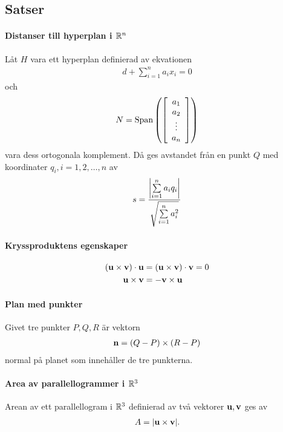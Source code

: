 \subsection{Satser}

\paragraph{Distanser till hyperplan i $\mathbb{R}^n$}
Låt $H$ vara ett hyperplan definierad av ekvationen
\begin{align*}
	d + \sum\limits_{i = 1}^{n} a_ix_i = 0
\end{align*}
och
\begin{align*}
	N = \text{Span}\left(
	\left[\begin{array}{c}
		a_1 \\
		a_2 \\
		\vdots \\
		a_n
	\end{array}\right]\right)
\end{align*}
vara dess ortogonala komplement. Då ges avstandet från en punkt $Q$ med koordinater $q_i, i = 1, 2, \dots, n$ av
\begin{align*}
	s = \frac{\abs{\sum\limits_{i = 1}^{n}a_iq_i}}{\sqrt{\sum\limits_{i = 1}^{n}a_i^2}}
\end{align*}

\proof

\paragraph{Kryssproduktens egenskaper}
\begin{align*}
	(\vect{u}\times\vect{v})\cdot\vect{u} &= (\vect{u}\times\vect{v})\cdot\vect{v} = 0 \\
	\vect{u}\times\vect{v}                &= -\vect{v}\times\vect{u}
\end{align*}

\proof

\paragraph{Plan med punkter}
Givet tre punkter $P, Q, R$ är vektorn
\begin{align*}
	\vect{n} = (Q - P)\times (R - P)
\end{align*}
normal på planet som innehåller de tre punkterna.

\proof

\paragraph{Area av parallellogrammer i $\mathbb{R}^3$}
Arean av ett parallellogram i $\mathbb{R}^3$ definierad av två vektorer $\vect{u}, \vect{v}$ ges av
\begin{align*}
	A = \abs{\vect{u}\times\vect{v}}.
\end{align*}

